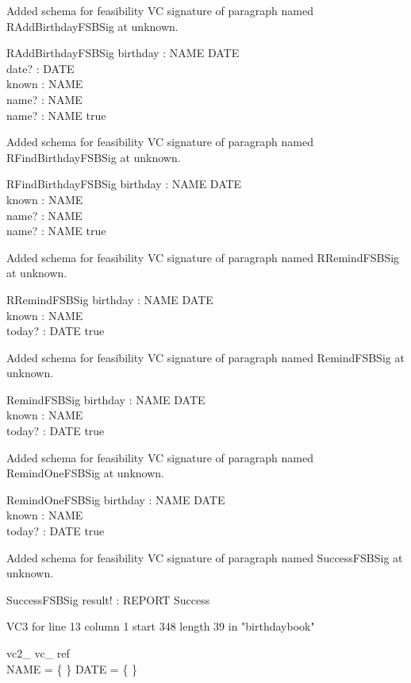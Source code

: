 \documentclass{article}
\begin{document}
Added schema for feasibility VC signature of paragraph named RAddBirthdayFSBSig at unknown.
\begin{schema}{RAddBirthdayFSBSig}
birthday : NAME \pfun DATE \\
 date? : DATE \\
 known : \power NAME \\
 name? : NAME \\
 name? : NAME 
\where
 true
\end{schema}


Added schema for feasibility VC signature of paragraph named RFindBirthdayFSBSig at unknown.
\begin{schema}{RFindBirthdayFSBSig}
birthday : NAME \pfun DATE \\
 known : \power NAME \\
 name? : NAME \\
 name? : NAME 
\where
 true
\end{schema}


Added schema for feasibility VC signature of paragraph named RRemindFSBSig at unknown.
\begin{schema}{RRemindFSBSig}
birthday : NAME \pfun DATE \\
 known : \power NAME \\
 today? : DATE 
\where
 true
\end{schema}


Added schema for feasibility VC signature of paragraph named RemindFSBSig at unknown.
\begin{schema}{RemindFSBSig}
birthday : NAME \pfun DATE \\
 known : \power NAME \\
 today? : DATE 
\where
 true
\end{schema}


Added schema for feasibility VC signature of paragraph named RemindOneFSBSig at unknown.
\begin{schema}{RemindOneFSBSig}
birthday : NAME \pfun DATE \\
 known : \power NAME \\
 today? : DATE 
\where
 true
\end{schema}


Added schema for feasibility VC signature of paragraph named SuccessFSBSig at unknown.
\begin{schema}{SuccessFSBSig}
result! : REPORT 
\where
 Success
\end{schema}

VC3 for line 13 column 1 start 348 length 39 in "birthdaybook"
\begin{theorem}{ vc2\_ vc\_ ref}\\
 \lnot NAME = \{ \} \land \lnot DATE = \{ \} \\

\end{theorem}
\end{document}
